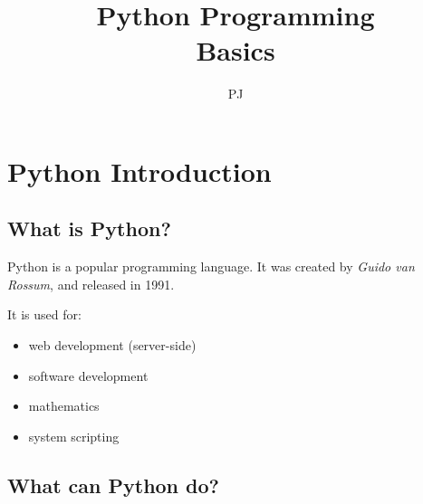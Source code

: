 \documentclass[12pt,a4paper]{article}
\title{\textbf{Python Programming} \\ \vspace{1cm} {\Large Basics}}
\author{PJ}
\date{}
\begin{document}
\setcounter{tocdepth}{2}

\pagestyle{fancy}
\maketitle
\vfill\newpage
\pagestyle{fancy}
\renewcommand{\headrulewidth}{0pt}
\addtolength{\topmargin}{-1.49998pt}
\setlength{\headheight}{14.49998pt}
\renewcommand{\sectionmark}[1]{%
\markboth{\thesection\quad #1}{}}
\fancyhead[R]{}
\fancyhead[C]{}
\fancyhead[L]{}
\fancyfoot{}
\fancyfoot[R]{(\thepage)}
\fancyfoot[C]{}
\fancyfoot[L]{}
\tableofcontents
\vfill\newpage
\renewcommand{\headrulewidth}{0.3pt}
\addtolength{\topmargin}{-1.49998pt}
\setlength{\headheight}{14.49998pt}
\renewcommand{\sectionmark}[1]{%
\markboth{\thesection\quad #1}{}}
\fancyhead[R]{\rightmark}
\fancyhead[C]{}
\fancyhead[L]{\leftmark}
\fancyfoot{}
\fancyfoot[R]{(\thepage)}
\fancyfoot[C]{}
\fancyfoot[L]{}

\section{Python Introduction}
\subsection{What is Python?}
Python is a popular programming language. It was created by {\itshape Guido van Rossum}, and released in 1991.

It is used for:

\begin{itemize}
	\item web development (server-side)
	\item software development
	\item mathematics
	\item system scripting
\end{itemize}

\subsection{What can Python do?}
\end{document}
